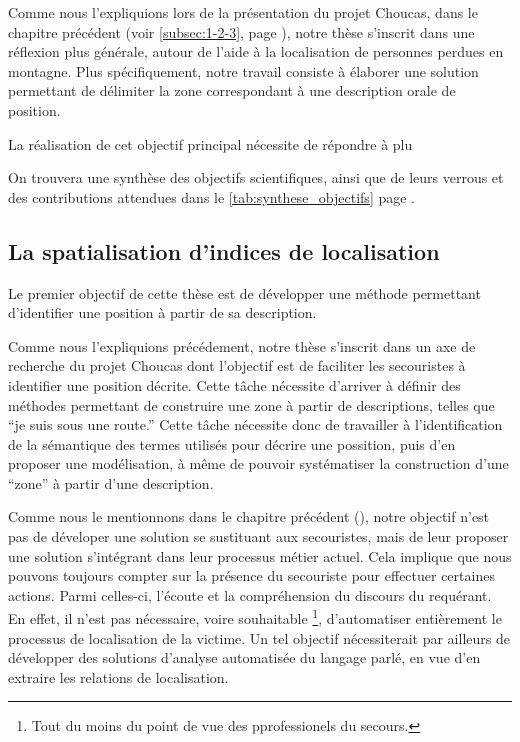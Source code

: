 Comme nous l'expliquions lors de la présentation du projet Choucas,
dans le chapitre précédent (voir \ref{subsec:1-2-3}, page
\pageref{subsec:1-2-3}), notre thèse s'inscrit dans une réflexion plus
générale, autour de l'aide à la localisation de personnes perdues en
montagne. Plus spécifiquement, notre travail consiste à élaborer une
solution permettant de délimiter la zone correspondant à une
description orale de position.

La réalisation de cet objectif principal nécessite de répondre à plu

On trouvera une synthèse des objectifs scientifiques, ainsi que de
leurs verrous et des contributions attendues dans le
\autoref{tab:synthese_objectifs} page
\pageref{tab:synthese_objectifs}.

\subsection{La spatialisation d'indices de localisation}
\label{subsec:2-1-1}

Le premier objectif de cette thèse est de développer une méthode
permettant d'identifier une position à partir de sa
description.

Comme nous l'expliquions précédement, notre thèse s'inscrit dans un
axe de recherche du projet Choucas dont l'objectif est de faciliter
les secouristes à identifier une position décrite.
%
Cette tâche nécessite d'arriver à définir des méthodes permettant de
construire une zone à partir de descriptions, telles que \enquote{je
  suis sous une route.} Cette tâche nécessite donc de travailler à
l'identification de la sémantique des termes utilisés pour décrire une
possition, puis d'en proposer une modélisation, à même de pouvoir
systématiser la construction d'une \enquote{zone} à partir d'une
description.

Comme nous le mentionnons dans le chapitre précédent (), notre
objectif n'est pas de déveloper une solution se sustituant aux
secouristes, mais de leur proposer une solution s'intégrant dans leur
processus métier actuel. Cela implique que nous pouvons toujours
compter sur la présence du secouriste pour effectuer certaines
actions. Parmi celles-ci, l'écoute et la compréhension du discours du
requérant. En effet, il n'est pas nécessaire, voire souhaitable
\footnote{Tout du moins du point de vue des pprofessionels du
  secours.}, d'automatiser entièrement le processus de localisation de
la victime. Un tel objectif nécessiterait par ailleurs de développer
des solutions d'analyse automatisée du langage parlé, en vue d'en
extraire les relations de localisation.

